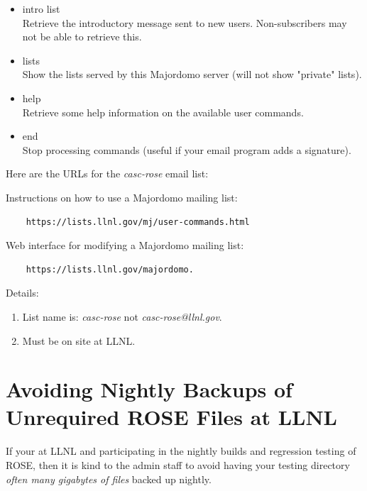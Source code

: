 {\begin{itemize}
   \item intro list \\
    Retrieve the introductory message sent to new users. Non-subscribers may not be able
    to retrieve this.

   \item lists \\
    Show the lists served by this Majordomo server (will not show "private" lists).

   \item help \\
    Retrieve some help information on the available user commands.

   \item end \\
    Stop processing commands (useful if your email program adds a signature). 
\end{itemize}


Here are the URLs for the {\em casc-rose} email list:

Instructions on how to use a Majordomo mailing list: \\
\begin{verbatim}
    https://lists.llnl.gov/mj/user-commands.html
\end{verbatim}

Web interface for modifying a Majordomo mailing list: \\
\begin{verbatim}
    https://lists.llnl.gov/majordomo.
\end{verbatim}

Details: \\
\begin{enumerate}
   \item List name is: {\em casc-rose} not {\em casc-rose@llnl.gov}.
   \item Must be on site at LLNL.
\end{enumerate}

}


\section{Avoiding Nightly Backups of Unrequired ROSE Files at LLNL}%

   If your at LLNL and participating in the nightly builds and
regression testing of ROSE, then it is kind to the admin staff
to avoid having your testing directory 
{\em often many gigabytes of files} backed up nightly.

